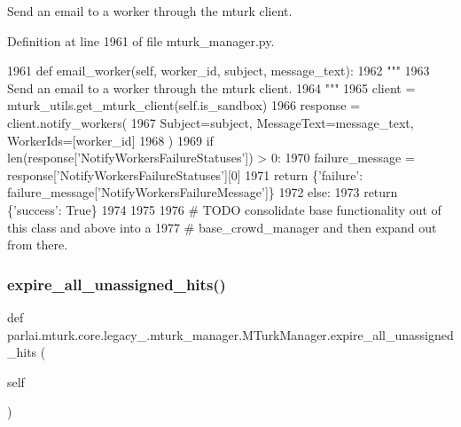 \begin{DoxyVerb}Send an email to a worker through the mturk client.
\end{DoxyVerb}
 

Definition at line 1961 of file mturk\+\_\+manager.\+py.


\begin{DoxyCode}
1961     \textcolor{keyword}{def }email\_worker(self, worker\_id, subject, message\_text):
1962         \textcolor{stringliteral}{"""}
1963 \textcolor{stringliteral}{        Send an email to a worker through the mturk client.}
1964 \textcolor{stringliteral}{        """}
1965         client = mturk\_utils.get\_mturk\_client(self.is\_sandbox)
1966         response = client.notify\_workers(
1967             Subject=subject, MessageText=message\_text, WorkerIds=[worker\_id]
1968         )
1969         \textcolor{keywordflow}{if} len(response[\textcolor{stringliteral}{'NotifyWorkersFailureStatuses'}]) > 0:
1970             failure\_message = response[\textcolor{stringliteral}{'NotifyWorkersFailureStatuses'}][0]
1971             \textcolor{keywordflow}{return} \{\textcolor{stringliteral}{'failure'}: failure\_message[\textcolor{stringliteral}{'NotifyWorkersFailureMessage'}]\}
1972         \textcolor{keywordflow}{else}:
1973             \textcolor{keywordflow}{return} \{\textcolor{stringliteral}{'success'}: \textcolor{keyword}{True}\}
1974 
1975 
1976 \textcolor{comment}{# TODO consolidate base functionality out of this class and above into a}
1977 \textcolor{comment}{# base\_crowd\_manager and then expand out from there.}
\end{DoxyCode}
\mbox{\label{classparlai_1_1mturk_1_1core_1_1legacy__2018_1_1mturk__manager_1_1MTurkManager_abfb1066860d209e5fee4a15b30cc88a6}} 
\subsubsection{\texorpdfstring{expire\+\_\+all\+\_\+unassigned\+\_\+hits()}{expire\_all\_unassigned\_hits()}}
{\footnotesize\ttfamily def parlai.\+mturk.\+core.\+legacy\+\_.\+mturk\+\_\+manager.\+M\+Turk\+Manager.\+expire\+\_\+all\+\_\+unassigned\+\_\+hits (\begin{DoxyParamCaption}\item[{}]{self }\end{DoxyParamCaption})}

